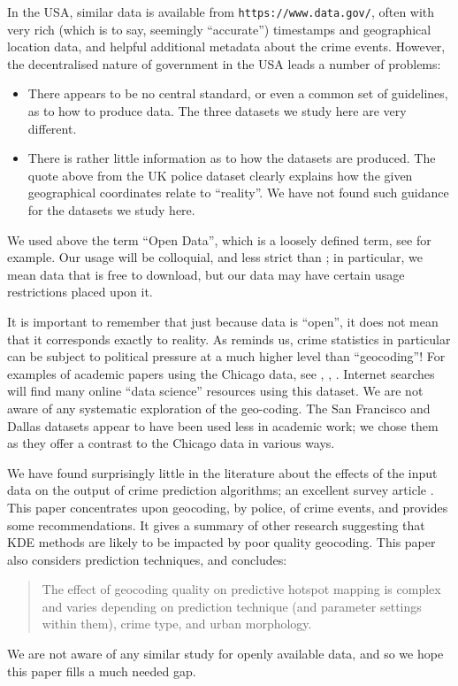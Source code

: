 \documentclass[twoside,a4paper,twocolumn,10pt]{article}
\theoremstyle{plain}
\theoremstyle{definition}
\begin{document}
In the USA, similar data is available from \texttt{https://www.data.gov/}, often with very
rich (which is to say, seemingly ``accurate'') timestamps and geographical location data,
and helpful additional metadata about the crime events.  However,
the decentralised nature of government in the USA leads a number of problems:
\begin{itemize}
\item There appears to be no central standard, or even a common set of guidelines,
  as to how to produce data.  The three datasets we study here are very different.
\item There is rather little information as to how the datasets are produced.  The quote
  above from the UK police dataset clearly explains how the given geographical coordinates
  relate to ``reality''.  We have not found such guidance for the datasets we study here.
\end{itemize}

We used above the term ``Open Data'', which is a loosely defined term, see \cite{odi}
for example.  Our usage will be colloquial, and less strict than \cite{odi}; in particular,
we mean data that is free to download, but our data may have certain usage restrictions
placed upon it.

It is important to remember that just because data is ``open'', it does not mean that it
corresponds exactly to reality.  As \cite{econ1} reminds us, crime statistics in particular
can be subject to political pressure at a much higher level than ``geocoding''!
For examples of academic papers using the Chicago data, see \cite{eftelioglu}, \cite{rosser_sepp},
\cite{hlo}.  Internet searches will find many online ``data science'' resources using this
dataset.  We are not aware of any systematic exploration of the geo-coding.  The San Francisco
and Dallas datasets appear to have been used less in academic work; we chose them as they offer
a contrast to the Chicago data in various ways.

We have found surprisingly little in the literature about the effects of the input data on
the output of crime prediction algorithms; an excellent survey article \cite{HZ}.  This paper
concentrates upon geocoding, by police, of crime events, and provides some recommendations.
It gives a summary of other research suggesting that KDE methods are likely to be impacted by
poor quality geocoding.  This paper also considers prediction techniques, and concludes:
\begin{quote}
The effect of geocoding quality on predictive hotspot mapping is complex and varies depending on prediction
technique (and parameter settings within them), crime type, and urban morphology.
\end{quote}
We are not aware of any similar study for openly available data, and so we hope this
paper fills a much needed gap.
\end{document}
